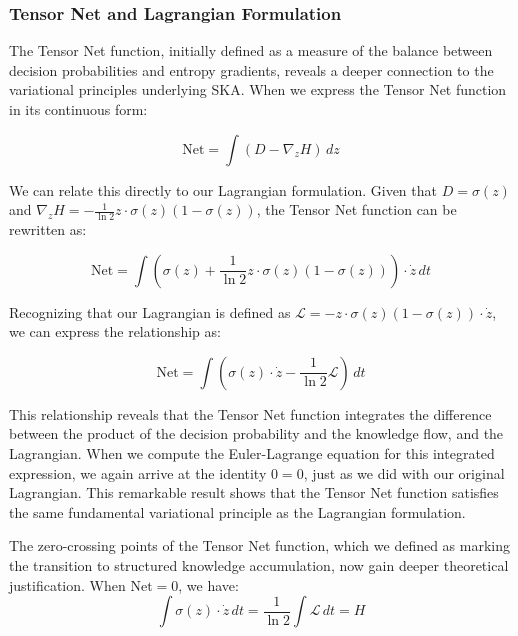 \documentclass{article}
\begin{document}
\subsubsection{Tensor Net and Lagrangian Formulation}

The Tensor Net function, initially defined as a measure of the balance between decision probabilities and entropy gradients, reveals a deeper connection to the variational principles underlying SKA. When we express the Tensor Net function in its continuous form:

\begin{equation}
	\text{Net} = \int (D - \nabla_z H) \, dz
\end{equation}

We can relate this directly to our Lagrangian formulation. Given that $D = \sigma(z)$ and $\nabla_z H = -\frac{1}{\ln 2}z \cdot \sigma(z)(1-\sigma(z))$, the Tensor Net function can be rewritten as:

\begin{equation}
	\text{Net} = \int \left(\sigma(z) + \frac{1}{\ln 2}z \cdot \sigma(z)(1-\sigma(z))\right) \cdot \dot{z} \, dt
\end{equation}

Recognizing that our Lagrangian is defined as $\mathcal{L} = -z \cdot \sigma(z)(1-\sigma(z)) \cdot \dot{z}$, we can express the relationship as:

\begin{equation}
	\text{Net} = \int \left(\sigma(z) \cdot \dot{z} - \frac{1}{\ln 2}\mathcal{L}\right) \, dt
\end{equation}


This relationship reveals that the Tensor Net function integrates the difference between the product of the decision probability and the knowledge flow, and the Lagrangian. When we compute the Euler-Lagrange equation for this integrated expression, we again arrive at the identity $0 = 0$, just as we did with our original Lagrangian. This remarkable result shows that the Tensor Net function satisfies the same fundamental variational principle as the Lagrangian formulation.

The zero-crossing points of the Tensor Net function, which we defined as marking the transition to structured knowledge accumulation, now gain deeper theoretical justification. When $\text{Net} = 0$, we have:
\begin{equation}
	\int \sigma(z) \cdot \dot{z} \, dt = \frac{1}{\ln 2} \int \mathcal{L} \, dt =  H
\end{equation}
\end{document}
